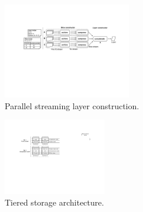 

\begin{figure}[t]
	\centering
	\centering
	\includegraphics[width=0.5\textwidth]{graphs/sift-layer-construct.pdf}
	\caption{Parallel streaming layer construction.}
	\label{fig:construct}
\end{figure}

\begin{figure}[t]
	\centering
	\centering
	\includegraphics[width=0.4\textwidth]{graphs/sift-cache.pdf}
	\caption{Tiered storage architecture.}
	\label{fig:restoring}
\end{figure} 